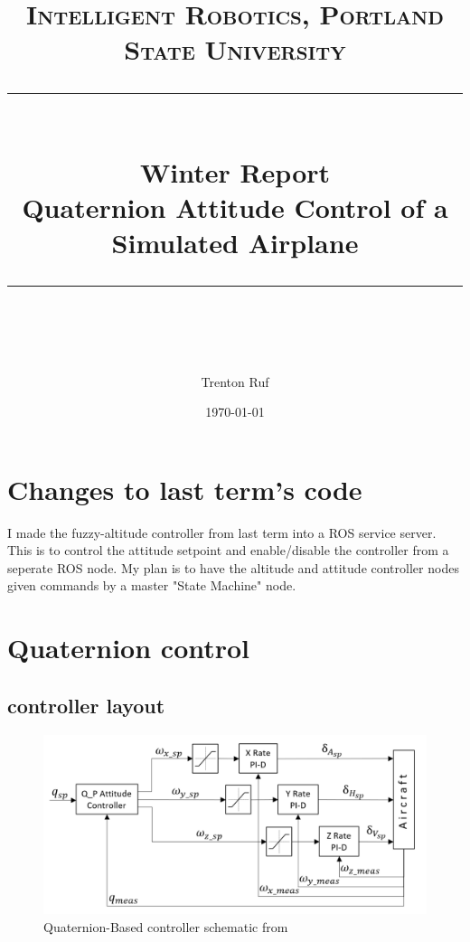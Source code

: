 \documentclass[11pt]{scrartcl} %
\title{	
	\normalfont\normalsize
	\textsc{Intelligent Robotics, Portland State University}\\ %
	\vspace{25pt} %
	\rule{\linewidth}{0.5pt}\\ %
	\vspace{20pt} %
	{\huge Winter Report}\\ %
	\vspace{4pt} %
	{\large Quaternion Attitude Control of a Simulated Airplane}\\ %
	\vspace{12pt} %
	\rule{\linewidth}{2pt}\\ %
	\vspace{12pt} %
}
\author{\LARGE Trenton Ruf} %
\date{\normalsize \today} %
\begin{document}
\maketitle %




\renewcommand\thesubsection{\Roman{subsection}}
\section{Changes to last term's code}
I made the fuzzy-altitude controller from last term into a ROS service server. This is to control the attitude setpoint and enable/disable the controller from a seperate ROS node. My plan is to have the altitude and attitude controller nodes given commands by a master "State Machine" node.


\section{Quaternion control}
\subsection{controller layout}

\begin{figure}[ht!] %
	\centering
	\includegraphics[width=0.9\columnwidth]{QuatSchematicPID.png} 
	\caption{Quaternion-Based controller schematic from ~\cite{quat}}
\end{figure}
\end{document}
